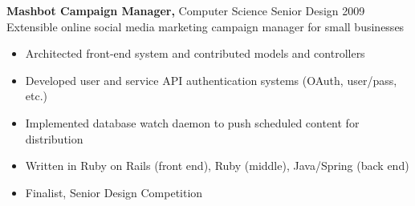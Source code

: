 \documentclass[margin]{res}
\begin{document}
\begin{resume}
 {\bf Mashbot Campaign Manager,} Computer Science Senior Design \hfill 2009 \\
Extensible online social media marketing campaign manager for small businesses
 \begin{itemize} \itemsep -2pt  %
 \item Architected front-end system and contributed models and controllers
 \item Developed user and service API authentication systems (OAuth, user/pass, etc.)
 \item Implemented database watch daemon to push scheduled content for distribution
 \item Written in Ruby on Rails (front end), Ruby (middle), Java/Spring (back end)
 \item Finalist, Senior Design Competition
 \end{itemize}





\end{resume}
\end{document}
